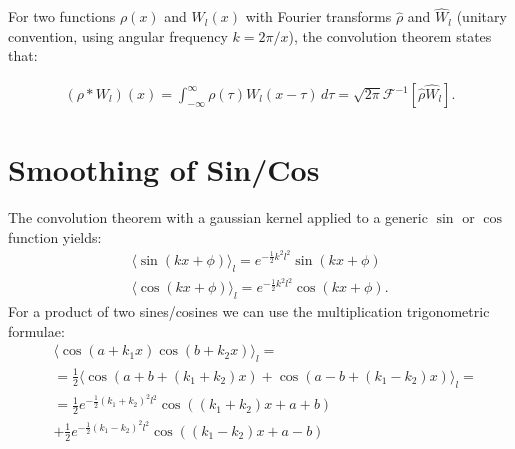 \documentclass[]{article}
\begin{document}
For two functions $\rho (x)$ and $ W_l (x)$ with Fourier transforms $\hat{\rho}$ and $ \hat{W}_l$  (unitary convention, using angular frequency $k = 2 \pi / x$), the convolution theorem states that:

\begin{align}\label{app:convolution}
	( \rho * W_l) (x) =  \int_{-\infty}^{\infty} \rho(\tau) W_l(x-\tau)\, d\tau = \sqrt{2 \pi} \mathcal{F}^{-1} \left[ \hat{\rho} \hat{W}_l \right].
\end{align}

\section{Smoothing of Sin/Cos}

The convolution theorem with a gaussian kernel applied to a generic $\sin$ or $\cos$ function yields:
%
\begin{align}
	\langle \sin(k x + \phi) \rangle_l = e^{-\frac{1}{2} k^2 l^2} \sin (k x + \phi) \\
	\langle \cos(k x + \phi) \rangle_l = e^{-\frac{1}{2} k^2 l^2} \cos (k x + \phi).
\end{align}
%
For a product of two sines/cosines we can use the multiplication trigonometric formulae:
%
\begin{align}
	&\langle \cos (a+ k_1 x) \cos (b+ k_2 x) \rangle_l = \\
	&= \frac{1}{2}\langle \cos (a+b+(k_1+k_2) x)+\cos (a-b+(k_1-k_2) x ) \rangle_l = \\
	&= \frac{1}{2}e^{-\frac{1}{2} (k_1+k_2)^2 l^2} \cos ((k_1+k_2) x + a+b) \\
	&+ \frac{1}{2}e^{-\frac{1}{2} (k_1-k_2)^2 l^2} \cos ((k_1-k_2) x + a-b)
\end{align}
\end{document}
